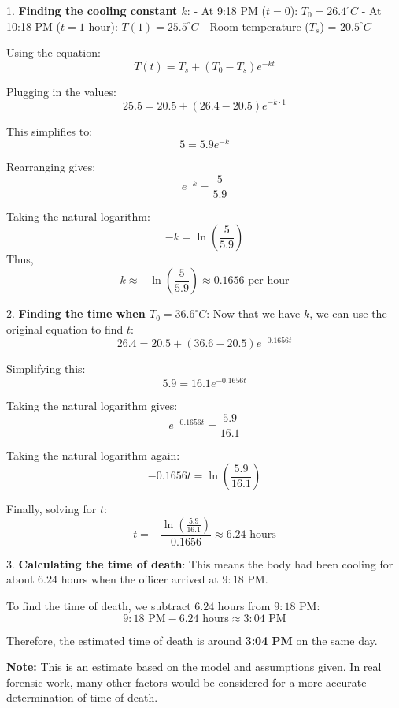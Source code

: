 \documentclass[a4paper, 12pt]{report}
\begin{document}
    1. \textbf{Finding the cooling constant \( k \)}:
    - At 9:18 PM (\( t = 0 \)): \( T_0 = 26.4^\circ C \)
    - At 10:18 PM (\( t = 1 \) hour): \( T(1) = 25.5^\circ C \)
    - Room temperature (\( T_s \)) = \( 20.5^\circ C \)
    
    Using the equation:
    \[
    T(t) = T_s + (T_0 - T_s)e^{-kt}
    \]
    
    Plugging in the values:
    \[
    25.5 = 20.5 + (26.4 - 20.5)e^{-k \cdot 1}
    \]
    
    This simplifies to:
    \[
    5 = 5.9e^{-k}
    \]
    
    Rearranging gives:
    \[
    e^{-k} = \frac{5}{5.9}
    \]
    
    Taking the natural logarithm:
    \[
    -k = \ln\left(\frac{5}{5.9}\right)
    \]
    Thus,
    \[
    k \approx -\ln\left(\frac{5}{5.9}\right) \approx 0.1656 \text{ per hour}
    \]
    
    2. \textbf{Finding the time when \( T_0 = 36.6^\circ C \)}:
    Now that we have \( k \), we can use the original equation to find \( t \):
    \[
    26.4 = 20.5 + (36.6 - 20.5)e^{-0.1656t}
    \]
    
    Simplifying this:
    \[
    5.9 = 16.1e^{-0.1656t}
    \]
    
    Taking the natural logarithm gives:
    \[
    e^{-0.1656t} = \frac{5.9}{16.1}
    \]
    
    Taking the natural logarithm again:
    \[
    -0.1656t = \ln\left(\frac{5.9}{16.1}\right)
    \]
    
    Finally, solving for \( t \):
    \[
    t = -\frac{\ln\left(\frac{5.9}{16.1}\right)}{0.1656} \approx 6.24 \text{ hours}
    \]
    
    3. \textbf{Calculating the time of death}:
    This means the body had been cooling for about \( 6.24 \) hours when the officer arrived at \( 9:18 \) PM.
    
    To find the time of death, we subtract \( 6.24 \) hours from \( 9:18 \) PM:
    \[
    9:18 \text{ PM} - 6.24 \text{ hours} \approx 3:04 \text{ PM}
    \]
    
    Therefore, the estimated time of death is around \textbf{3:04 PM} on the same day.
    
    \textbf{Note:} This is an estimate based on the model and assumptions given. In real forensic work, many other factors would be considered for a more accurate determination of time of death.
\end{document}
